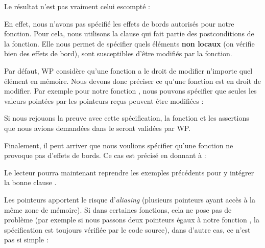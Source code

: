 


Le résultat n'est pas vraiment celui escompté :





En effet, nous n'avons pas spécifié les effets de bords autorisés pour notre
fonction. Pour cela, nous utilisons la clause 
qui fait partie des postconditions de la fonction. Elle nous permet de spécifier
quels éléments \textbf{non locaux} (on vérifie bien des effets de bord), sont
susceptibles d'être modifiés par la fonction.



Par défaut, WP considère qu'une fonction a le droit de modifier n'importe quel
élément en mémoire. Nous devons donc préciser ce qu'une fonction est en droit
de modifier. Par exemple pour notre fonction , nous pouvons
spécifier que seules les valeurs pointées par les pointeurs reçus peuvent être
modifiées :






Si nous rejouons la preuve avec cette spécification, la fonction et les
assertions que nous avions demandées dans le  seront validées par WP.



Finalement, il peut arriver que nous voulions spécifier qu'une fonction ne
provoque pas d'effets de bords. Ce cas est précisé en donnant 
à  :






Le lecteur pourra maintenant reprendre les exemples précédents pour y intégrer
la bonne clause .





Les pointeurs apportent le risque d'\textit{aliasing} (plusieurs pointeurs ayant accès à
la même zone de mémoire). Si dans certaines fonctions, cela ne pose pas de
problème (par exemple si nous passons deux pointeurs égaux
à notre fonction , la spécification est toujours vérifiée par le
code source), dans d'autre cas, ce n'est pas si simple :



